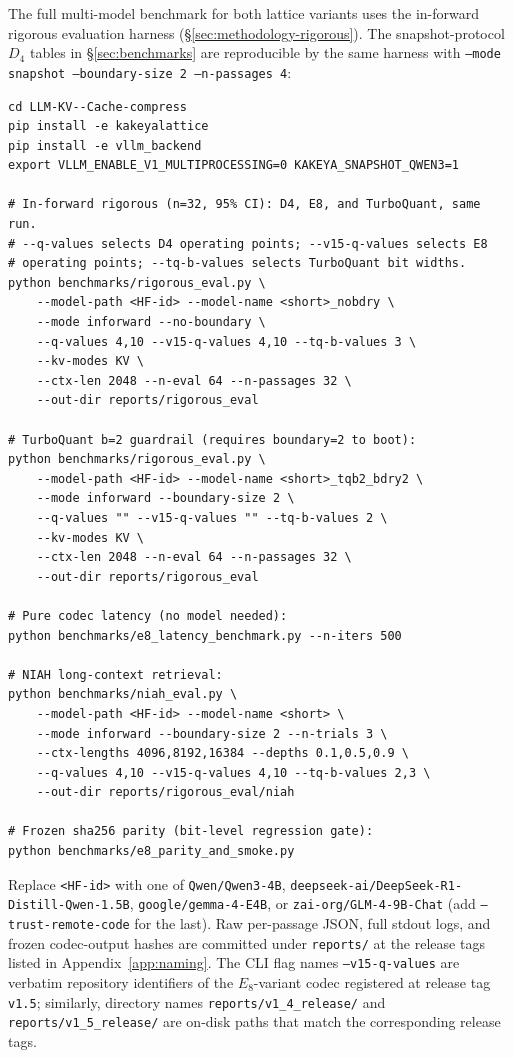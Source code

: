 \documentclass[10pt,a4paper]{article}
\theoremstyle{definition}
\theoremstyle{plain}
\begin{document}
The full multi-model benchmark for both lattice variants uses the
in-forward rigorous evaluation harness
(\S\ref{sec:methodology-rigorous}). The snapshot-protocol $D_4$
tables in \S\ref{sec:benchmarks} are reproducible by the same
harness with \texttt{--mode snapshot --boundary-size 2 --n-passages 4}:
\begin{verbatim}
cd LLM-KV--Cache-compress
pip install -e kakeyalattice
pip install -e vllm_backend
export VLLM_ENABLE_V1_MULTIPROCESSING=0 KAKEYA_SNAPSHOT_QWEN3=1

# In-forward rigorous (n=32, 95% CI): D4, E8, and TurboQuant, same run.
# --q-values selects D4 operating points; --v15-q-values selects E8
# operating points; --tq-b-values selects TurboQuant bit widths.
python benchmarks/rigorous_eval.py \
    --model-path <HF-id> --model-name <short>_nobdry \
    --mode inforward --no-boundary \
    --q-values 4,10 --v15-q-values 4,10 --tq-b-values 3 \
    --kv-modes KV \
    --ctx-len 2048 --n-eval 64 --n-passages 32 \
    --out-dir reports/rigorous_eval

# TurboQuant b=2 guardrail (requires boundary=2 to boot):
python benchmarks/rigorous_eval.py \
    --model-path <HF-id> --model-name <short>_tqb2_bdry2 \
    --mode inforward --boundary-size 2 \
    --q-values "" --v15-q-values "" --tq-b-values 2 \
    --kv-modes KV \
    --ctx-len 2048 --n-eval 64 --n-passages 32 \
    --out-dir reports/rigorous_eval

# Pure codec latency (no model needed):
python benchmarks/e8_latency_benchmark.py --n-iters 500

# NIAH long-context retrieval:
python benchmarks/niah_eval.py \
    --model-path <HF-id> --model-name <short> \
    --mode inforward --boundary-size 2 --n-trials 3 \
    --ctx-lengths 4096,8192,16384 --depths 0.1,0.5,0.9 \
    --q-values 4,10 --v15-q-values 4,10 --tq-b-values 2,3 \
    --out-dir reports/rigorous_eval/niah

# Frozen sha256 parity (bit-level regression gate):
python benchmarks/e8_parity_and_smoke.py
\end{verbatim}
Replace \texttt{<HF-id>} with one of
\texttt{Qwen/Qwen3-4B},
\texttt{deepseek-ai/DeepSeek-R1-Distill-Qwen-1.5B},
\texttt{google/gemma-4-E4B}, or
\texttt{zai-org/GLM-4-9B-Chat} (add \texttt{--trust-remote-code}
for the last). Raw per-passage JSON, full stdout logs, and frozen
codec-output hashes are committed under
\texttt{reports/} at the release tags listed in
Appendix~\ref{app:naming}. The CLI flag names
\texttt{--v15-q-values} are verbatim repository identifiers of the
$E_8$-variant codec registered at release tag \texttt{v1.5};
similarly, directory names \texttt{reports/v1\_4\_release/} and
\texttt{reports/v1\_5\_release/} are on-disk paths that match the
corresponding release tags.
\end{document}

